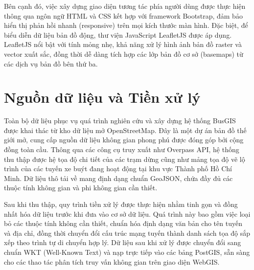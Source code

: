 Bên cạnh đó, việc xây dựng giao diện tương tác phía người dùng được thực hiện thông qua ngôn ngữ HTML và CSS kết hợp với framework Bootstrap, đảm bảo hiển thị phản hồi nhanh (responsive) trên mọi kích thước màn hình. Đặc biệt, để biểu diễn dữ liệu bản đồ động, thư viện JavaScript LeafletJS được áp dụng. LeafletJS nổi bật với tính mỏng nhẹ, khả năng xử lý hình ảnh bản đồ raster và vector xuất sắc, đồng thời dễ dàng tích hợp các lớp bản đồ cơ sở (basemaps) từ các dịch vụ bản đồ bên thứ ba.

\section{Nguồn dữ liệu và Tiền xử lý}

Toàn bộ dữ liệu phục vụ quá trình nghiên cứu và xây dựng hệ thống BusGIS được khai thác từ kho dữ liệu mở OpenStreetMap. Đây là một dự án bản đồ thế giới mở, cung cấp nguồn dữ liệu không gian phong phú được đóng góp bởi cộng đồng toàn cầu. Thông qua các công cụ truy xuất như Overpass API, hệ thống thu thập được hệ tọa độ chi tiết của các trạm dừng cũng như mảng tọa độ vẽ lộ trình của các tuyến xe buýt đang hoạt động tại khu vực Thành phố Hồ Chí Minh. Dữ liệu thô tải về mang định dạng chuẩn GeoJSON, chứa đầy đủ các thuộc tính không gian và phi không gian cần thiết.

Sau khi thu thập, quy trình tiền xử lý được thực hiện nhằm tinh gọn và đồng nhất hóa dữ liệu trước khi đưa vào cơ sở dữ liệu. Quá trình này bao gồm việc loại bỏ các thuộc tính không cần thiết, chuẩn hóa định dạng văn bản cho tên tuyến và địa chỉ, đồng thời chuyển đổi cấu trúc mạng tuyến thành danh sách tọa độ sắp xếp theo trình tự di chuyển hợp lý. Dữ liệu sau khi xử lý được chuyển đổi sang chuẩn WKT (Well-Known Text) và nạp trực tiếp vào các bảng PostGIS, sẵn sàng cho các thao tác phân tích truy vấn không gian trên giao diện WebGIS.

